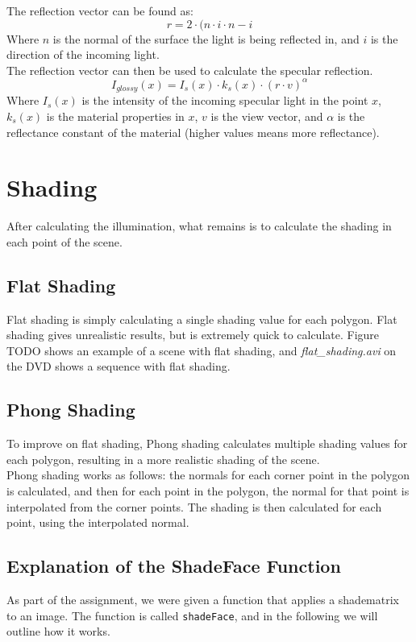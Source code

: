 \documentclass[a4paper,11pt]{article}
\begin{document}
The reflection vector can be found as:
\[r=2 \cdot (n \cdot i \cdot n - i\]
Where $n$ is the normal of the surface the light is being reflected in, and $i$ is the direction of the incoming light.\\

The reflection vector can then be used to calculate the specular reflection.
\[I_{glossy}(x)=I_s(x) \cdot k_s(x) \cdot (r \cdot v)^\alpha\]
Where $I_s(x)$ is the intensity of the incoming specular light in the point $x$, $k_s(x)$ is the material properties in $x$, $v$ is the view vector, and $\alpha$ is the reflectance constant of the material (higher values means more reflectance).
\section{Shading}
After calculating the illumination, what remains is to calculate the shading in each point of the scene.
\subsection{Flat Shading}
Flat shading is simply calculating a single shading value for each polygon. Flat shading gives unrealistic results, but is extremely quick to calculate. Figure TODO shows an example of a scene with flat shading, and \emph{flat\_shading.avi} on the DVD shows a sequence with flat shading. 

\subsection{Phong Shading}
To improve on flat shading, Phong shading calculates multiple shading values for each polygon, resulting in a more realistic shading of the scene.\\

Phong shading works as follows: the normals for each corner point in the polygon is calculated, and then for each point in the polygon, the normal for that point is interpolated from the corner points. The shading is then calculated for each point, using the interpolated normal.\\

\subsection{Explanation of the ShadeFace Function}
As part of the assignment, we were given a function that applies a shadematrix to an image. The function is called \texttt{shadeFace}, and in the following we will outline how it works.
\end{document}
